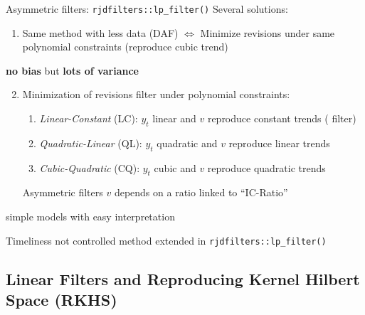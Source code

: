 \documentclass[10pt,xcolor=table,color={dvipsnames,usenames},ignorenonframetext,usepdftitle=false,english]{beamer}
\providecommand{\tightlist}{%
  \setlength{\parskip}{0pt}
  }
\newcommand\1{\mathds{1}}
\begin{document}
\begin{frame}[fragile]{Asymmetric filters: 
\texttt{rjdfilters::lp\_filter()}}
\protect\hypertarget{asymmetric-filters-rjdfilterslp_filter}{}
Several solutions:

\begin{enumerate}
\tightlist
\item
  Same method with less data (DAF) \(\iff\) Minimize revisions under
  same polynomial constraints (reproduce cubic trend)
\end{enumerate}

\faArrowCircleRight{} \textbf{no bias} but \textbf{lots of variance}

\pause

\begin{enumerate}
\setcounter{enumi}{1}
\item
  Minimization of revisions filter under polynomial constraints:

  \begin{enumerate}
  \item
    \emph{Linear-Constant} (LC): \(y_t\) linear and \(v\) reproduce
    constant trends ( filter)
  \item
    \emph{Quadratic-Linear} (QL): \(y_t\) quadratic and \(v\) reproduce
    linear trends
  \item
    \emph{Cubic-Quadratic} (CQ): \(y_t\) cubic and \(v\) reproduce
    quadratic trends
  \end{enumerate}

  \faArrowCircleRight{} Asymmetric filters \(v\) depends on a ratio
  linked to ``IC-Ratio''
\end{enumerate}

\pause

\bcsmbh simple models with easy interpretation

\bcsmmh Timeliness not controlled \faArrowCircleRight{} method extended
in \texttt{rjdfilters::lp\_filter()}
\end{frame}

\hypertarget{linear-filters-and-reproducing-kernel-hilbert-space-rkhs}{%
\subsection{Linear Filters and Reproducing Kernel Hilbert Space
(RKHS)}\label{linear-filters-and-reproducing-kernel-hilbert-space-rkhs}}
\end{document}
